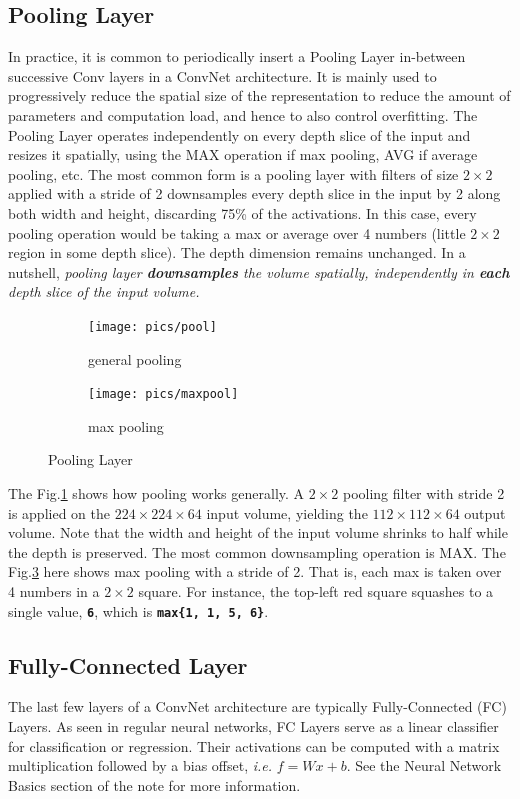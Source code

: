\documentclass[twoside]{article}
\begin{document}
\subsection{Pooling Layer}
In practice, it is common to periodically insert a Pooling Layer in-between successive Conv layers in a ConvNet architecture. It is mainly used to progressively reduce the spatial size of the representation to reduce the amount of parameters and computation load, and hence to also control overfitting. The Pooling Layer operates independently on every depth slice of the input and resizes it spatially, using the MAX operation if max pooling, AVG if average pooling, etc. The most common form is a pooling layer with filters of size $2\times2$ applied with a stride of 2 downsamples every depth slice in the input by 2 along both width and height, discarding 75\% of the activations. In this case, every pooling operation would be taking a max or average over 4 numbers (little $2\times2$ region in some depth slice). The depth dimension remains unchanged. In a nutshell, \textit{pooling layer \textbf{downsamples} the volume spatially, independently in \textbf{each} depth slice of the input volume.}

\begin{figure}[!htb]
\begin{subfigure}[!htb]{0.45\linewidth}
\texttt{[image: pics/pool]}
\caption{general pooling}
\label{fig:genpool}
\end{subfigure}
\hfill
\begin{subfigure}[!htb]{0.54\linewidth}
\texttt{[image: pics/maxpool]}
\caption{max pooling}
\label{fig:maxpool}
\end{subfigure}
\caption{Pooling Layer\cite{cs231n-website}}
\end{figure}

The Fig.\ref{fig:genpool} shows how pooling works generally. A $2\times2$ pooling filter with stride 2 is applied on the $224\times224\times64$ input volume, yielding the $112\times112\times64$ output volume. Note that the width and height of the input volume shrinks to half while the depth is preserved. The most common downsampling operation is MAX. The Fig.\ref{fig:maxpool} here shows max pooling with a stride of 2. That is, each max is taken over 4 numbers in a $2\times2$ square. For instance, the top-left red square squashes to a single value, \texttt{\textbf{6}}, which is \texttt{\textbf{max\{1, 1, 5, 6\}}}.

\subsection{Fully-Connected Layer}
The last few layers of a ConvNet architecture are typically Fully-Connected (FC) Layers. As seen in regular neural networks, FC Layers serve as a linear classifier for classification or regression. Their activations can be computed with a matrix multiplication followed by a bias offset, \textit{i.e.} $f = Wx + b$. See the Neural Network Basics section of the note for more information.
\end{document}
